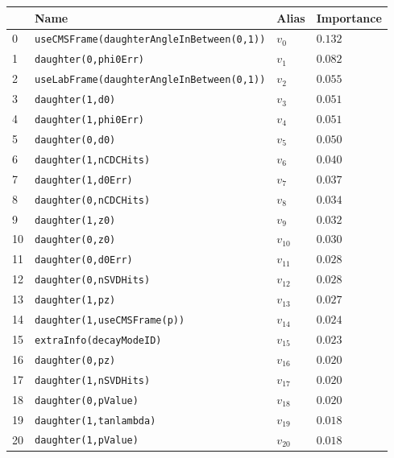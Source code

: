\begin{longtable}{| p{} | p{} | p{} |p{} |}
\hline
& Name & Alias & Importance \\ \hline
0 &\texttt{\footnotesize useCMSFrame(daughterAngleInBetween(0,1))} & $v_{0}$ & $0.132$ \\ \hline
1 &\texttt{\footnotesize daughter(0,phi0Err)} & $v_{1}$ & $0.082$ \\ \hline
2 &\texttt{\footnotesize useLabFrame(daughterAngleInBetween(0,1))} & $v_{2}$ & $0.055$ \\ \hline
3 &\texttt{\footnotesize daughter(1,d0)} & $v_{3}$ & $0.051$ \\ \hline
4 &\texttt{\footnotesize daughter(1,phi0Err)} & $v_{4}$ & $0.051$ \\ \hline
5 &\texttt{\footnotesize daughter(0,d0)} & $v_{5}$ & $0.050$ \\ \hline
6 &\texttt{\footnotesize daughter(1,nCDCHits)} & $v_{6}$ & $0.040$ \\ \hline
7 &\texttt{\footnotesize daughter(1,d0Err)} & $v_{7}$ & $0.037$ \\ \hline
8 &\texttt{\footnotesize daughter(0,nCDCHits)} & $v_{8}$ & $0.034$ \\ \hline
9 &\texttt{\footnotesize daughter(1,z0)} & $v_{9}$ & $0.032$ \\ \hline
10 &\texttt{\footnotesize daughter(0,z0)} & $v_{10}$ & $0.030$ \\ \hline
11 &\texttt{\footnotesize daughter(0,d0Err)} & $v_{11}$ & $0.028$ \\ \hline
12 &\texttt{\footnotesize daughter(0,nSVDHits)} & $v_{12}$ & $0.028$ \\ \hline
13 &\texttt{\footnotesize daughter(1,pz)} & $v_{13}$ & $0.027$ \\ \hline
14 &\texttt{\footnotesize daughter(1,useCMSFrame(p))} & $v_{14}$ & $0.024$ \\ \hline
15 &\texttt{\footnotesize extraInfo(decayModeID)} & $v_{15}$ & $0.023$ \\ \hline
16 &\texttt{\footnotesize daughter(0,pz)} & $v_{16}$ & $0.020$ \\ \hline
17 &\texttt{\footnotesize daughter(1,nSVDHits)} & $v_{17}$ & $0.020$ \\ \hline
18 &\texttt{\footnotesize daughter(0,pValue)} & $v_{18}$ & $0.020$ \\ \hline
19 &\texttt{\footnotesize daughter(1,tanlambda)} & $v_{19}$ & $0.018$ \\ \hline
20 &\texttt{\footnotesize daughter(1,pValue)} & $v_{20}$ & $0.018$ \\ \hline

\end{longtable}
